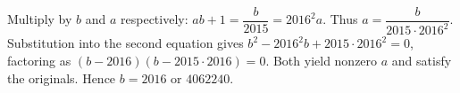 Multiply by $ b $ and $ a $ respectively: $ ab+1=\dfrac{b}{2015}=2016^2a $. Thus $ a=\dfrac{b}{2015\cdot2016^2}$. Substitution into the second equation gives $ b^2-2016^2b+2015\cdot2016^2=0 $, factoring as $(b-2016)(b-2015\cdot2016)=0 $. Both yield nonzero $ a $ and satisfy the originals. Hence $\boxed{b=2016\text{ or }4062240}$.
